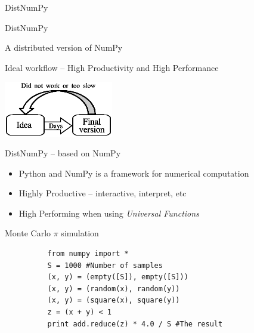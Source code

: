 \documentclass{beamer}
\begin{document}
\begin{frame}{DistNumPy}
\begin{center}
\begin{Huge}
DistNumPy
\end{Huge}

\vspace{7px}
A distributed version of NumPy

\vspace{25px}
\begin{scriptsize}
Ideal workflow -- High Productivity and High Performance
\end{scriptsize}
\includegraphics[width=180px]{../gfx/workflow2}
\end{center}
\end{frame}


\begin{frame}[fragile]{DistNumPy -- based on NumPy}
\begin{itemize}
  \item Python and NumPy is a framework for numerical computation
  \item Highly Productive -- interactive, interpret, etc
  \item High Performing when using \emph{Universal Functions}
\end{itemize}
\vspace{15px}
\begin{center}
\begin{small}
Monte Carlo $\pi$ simulation
\end{small}
\begin{scriptsize}
\begin{verbatim}
          from numpy import *
          S = 1000 #Number of samples
          (x, y) = (empty([S]), empty([S]))
          (x, y) = (random(x), random(y))
          (x, y) = (square(x), square(y))
          z = (x + y) < 1
          print add.reduce(z) * 4.0 / S #The result
\end{verbatim}
\end{scriptsize}
\end{center}
\end{frame}
\end{document}
